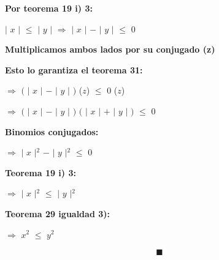 \documentclass[12pt]{article}
\renewcommand{\qedsymbol}{$\blacksquare$}
\begin{document}
{\textcolor{carrotorange}{\bfseries{Por teorema 19 i) 3:}}}

\hspace{4cm} $\mid$ $x$ $\mid$ \hspace{0.1cm} $\leq$ \hspace{0.1cm} $\mid$ $y$ $\mid$ \hspace{0.2cm} $\Longrightarrow$ \hspace{0.2cm} $\mid$ $x$ $\mid$ $-$ $\mid$ $y$ $\mid$ $\leq$ \hspace{0.1cm} $0$ \vspace{0.5cm}

{\textcolor{carrotorange}{\bfseries{Multiplicamos ambos lados por su conjugado (z)}}} \vspace{0.5cm}

{\textcolor{carrotorange}{\bfseries{Esto lo garantiza el teorema 31:}}} \vspace{0.5cm}

\hspace{7cm}  $\Longrightarrow$ \hspace{0.2cm} $\big($ $\mid$ $x$ $\mid$ $-$ $\mid$ $y$ $\mid$ $\big)$ ($z$) \hspace{0.2cm} $\leq$ \hspace{0.1cm} $0$ ($z$) \vspace{0.5cm}

\hspace{7cm}  $\Longrightarrow$ \hspace{0.2cm} $\big($ $\mid$ $x$ $\mid$ $-$ $\mid$ $y$ $\mid$ $\big)$ $\big($ $\mid$ $x$ $\mid$ $+$ $\mid$ $y$ $\mid$ $\big)$ \hspace{0.2cm} $\leq$ \hspace{0.1cm} $0$ \vspace{0.5cm}

{\textcolor{carrotorange}{\bfseries{Binomios conjugados:}}} \vspace{0.5cm}

\hspace{7cm}  $\Longrightarrow$ \hspace{0.2cm}  $\mid$ $x$ $\mid$$^{2}$ $-$ $\mid$ $y$ $\mid$$^{2}$ \hspace{0.2cm} $\leq$ \hspace{0.1cm} $0$ \vspace{0.5cm}

{\textcolor{carrotorange}{\bfseries{Teorema 19 i) 3:}}} \vspace{0.5cm}

\hspace{7cm}  $\Longrightarrow$ \hspace{0.2cm}  $\mid$ $x$ $\mid$$^{2}$  \hspace{0.2cm} $\leq$ \hspace{0.1cm} $\mid$ $y$ $\mid$$^{2}$ \vspace{0.5cm}

{\textcolor{carrotorange}{\bfseries{Teorema 29 igualdad 3):}}} \vspace{0.5cm}

\hspace{7cm}  $\Longrightarrow$ \hspace{0.2cm}  $x^{2}$  \hspace{0.2cm} $\leq$ \hspace{0.1cm}  $y^{2}$ \vspace{0.5cm}

\hspace{7.5cm} {\textcolor{carrotorange}{$\qedsymbol$}} 
\end{document}
